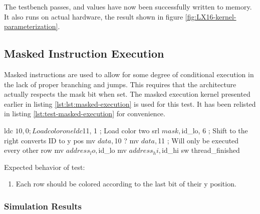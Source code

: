 \documentclass[../main/report.tex]{subfiles}
\begin{document}
The testbench passes, and values have now been successfully written to memory.
It also runs on actual hardware, the result shown in figure \ref{fig:LX16-kernel-parameterization}.

\subsection{Masked Instruction Execution}

Masked instructions are used to allow for some degree of conditional execution in the lack of proper branching and jumps.
This requires that the architecture actually respects the mask bit when set.
The masked execution kernel presented earlier in listing \ref{lst:lst:masked-execution} is used for this test.
It has been relisted in listing \ref{lst:test-masked-execution} for convenience.

\begin{assembly}[caption=Conditional execution using predicated instructions, label=lst:test-masked-execution]
ldc $10, 0 ; Load color one
ldc $11, 1 ; Load color two
srl $mask, $id_lo, 6 ; Shift to the right converts ID to y pos
mv $data, $10
? mv $data, $11 ; Will only be executed every other row
mv $address_lo, $id_lo
mv $address_hi, $id_hi
sw
thread_finished
\end{assembly}

Expected behavior of test:
\begin{enumerate}
  \item
    Each row should be colored according to the last bit of their y position.
\end{enumerate}

\subsubsection*{Simulation Results}
\end{document}
